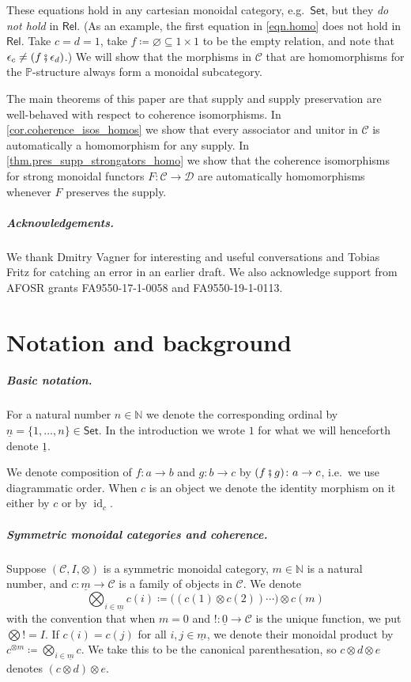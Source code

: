 \documentclass[11pt, oneside, article]{memoir}
\theoremstyle{plain}
\theoremstyle{definition}
\theoremstyle{remark}
\newcommand{\ord}[1]{\underline{#1}}%
\newcommand{\cat}[1]{\mathcal{#1}}%
\newcommand{\Cat}[1]{{\mathsf{#1}}}%
\DeclareMathOperator{\id}{id}
\newcommand{\tpow}[1]{^{\otimes #1}}
\newcommand{\smset}{\Cat{Set}}
\newcommand{\nn}{\mathbb{N}}
\newcommand{\pp}{\mathbb{P}}
\newcommand{\rel}{\Cat{Rel}}
\newcommand{\cp}{\mathbin{\fatsemi}}
\renewcommand{\ss}{\subseteq}
\begin{document}
These equations hold in any cartesian monoidal category, e.g.\ $\smset$, but they \emph{do not hold} in $\rel$. (As an example, the first equation in \eqref{eqn.homo} does not hold in $\rel$. Take $c=d=1$, take $f\coloneqq\varnothing\ss 1\times 1$ to be the empty relation, and note that $\epsilon_c \neq (f\cp\epsilon_d)$.) We will show that the morphisms in $\cat{C}$ that are homomorphisms for the $\pp$-structure always form a monoidal subcategory.

The main theorems of this paper are that supply and supply preservation are well-behaved with respect to coherence isomorphisms. In \cref{cor.coherence_isos_homos} we show that every associator and unitor in $\cat{C}$ is automatically a homomorphism for any supply. In \cref{thm.pres_supp_strongators_homo} we show that the coherence isomorphisms for strong monoidal functors $F\colon\cat{C}\to\cat{D}$ are automatically homomorphisms whenever $F$ preserves the supply.
 
\paragraph{Acknowledgements.}
We thank Dmitry Vagner for interesting and useful conversations and Tobias Fritz for catching an error in an earlier draft. We also acknowledge support from AFOSR grants FA9550-17-1-0058 and FA9550-19-1-0113.


\chapter{Notation and background}

\paragraph{Basic notation.}
For a natural number $n\in\nn$ we denote the corresponding ordinal by $\ord{n}=\{1,\ldots,n\}\in\smset$. In the introduction we wrote $1$ for what we will henceforth denote $\ord{1}$.

We denote composition of $f\colon a\to b$ and $g\colon b\to c$ by $(f\cp g)\colon a\to c$, i.e.\ we use diagrammatic order. When $c$ is an object we denote the identity morphism on it either by $c$ or by $\id_c$.

\paragraph{Symmetric monoidal categories and coherence.}
Suppose $(\cat{C}, I, \otimes)$ is a symmetric monoidal category, $m\in\nn$ is a natural number, and $c\colon\ord{m}\to\cat{C}$ is a family of objects in $\cat{C}$. We denote
\[
	\bigotimes_{i\in\ord{m}}c(i)\coloneqq
  \big((c(1)\otimes c(2))\cdots\big)\otimes c(m)
\]
with the convention that when $m=0$ and $!\colon\ord{0}\to \cat{C}$ is the unique function, we put $\bigotimes != I$. If $c(i)=c(j)$ for all $i,j\in\ord{m}$, we denote their monoidal product by $c\tpow{m}\coloneqq\bigotimes_{i\in\ord{m}}c$. We take this to be the canonical parenthesation, so $c\otimes d\otimes e$ denotes $(c\otimes d)\otimes e$. 
\end{document}
